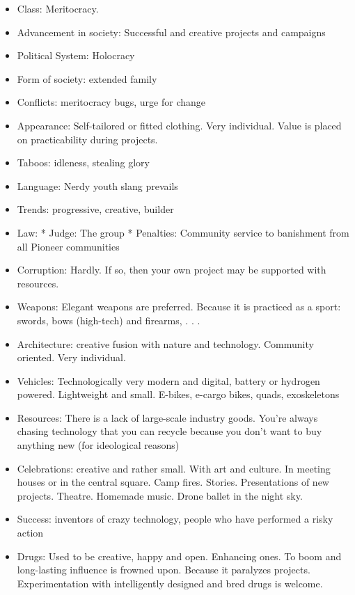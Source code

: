 \begin{itemize}
    \item Class: Meritocracy.
    \item Advancement in society: Successful and creative projects and campaigns
    \item Political System: Holocracy
    \item Form of society: extended family
    \item Conflicts: meritocracy bugs, urge for change
    \item Appearance: Self-tailored or fitted clothing. Very individual. Value is placed on practicability during projects.
    \item Taboos: idleness, stealing glory
    \item Language: Nerdy youth slang prevails
    \item Trends: progressive, creative, builder
    \item Law: * Judge: The group * Penalties: Community service to banishment from all Pioneer communities
    \item Corruption: Hardly. If so, then your own project may be supported with resources.
    \item Weapons: Elegant weapons are preferred. Because it is practiced as a sport: swords, bows (high-tech) and firearms, . . .
    \item Architecture: creative fusion with nature and technology. Community oriented. Very individual.
    \item Vehicles: Technologically very modern and digital, battery or hydrogen powered. Lightweight and small. E-bikes, e-cargo bikes, quads, exoskeletons
    \item Resources: There is a lack of large-scale industry goods. You're always chasing technology that you can recycle because you don't want to buy anything new (for ideological reasons)
    \item Celebrations: creative and rather small. With art and culture. In meeting houses or in the central square. Camp fires. Stories. Presentations of new projects. Theatre. Homemade music. Drone ballet in the night sky.
    \item Success: inventors of crazy technology, people who have performed a risky action
    \item Drugs: Used to be creative, happy and open. Enhancing ones. To boom and long-lasting influence is frowned upon. Because it paralyzes projects. Experimentation with intelligently designed and bred drugs is welcome.

\end{itemize}
